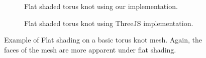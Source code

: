 \documentclass[10pt,twocolumn,letterpaper]{article}
\begin{document}

\begin{figure}
    \centering
    \begin{subfigure}{.48\linewidth}
        \caption{Flat shaded torus knot using our implementation.}
        \label{fig:our-flat-tk}
    \end{subfigure}
    \hfill
    \begin{subfigure}{.48\linewidth}
        \caption{Flat shaded torus knot using ThreeJS implementation.}
        \label{fig:three-flat-tk}
    \end{subfigure}
    \caption{Example of Flat shading on a basic torus knot mesh. Again, the faces of the mesh are more apparent under flat shading.}
    \label{fig:flat-tk}
\end{figure}
\end{document}
